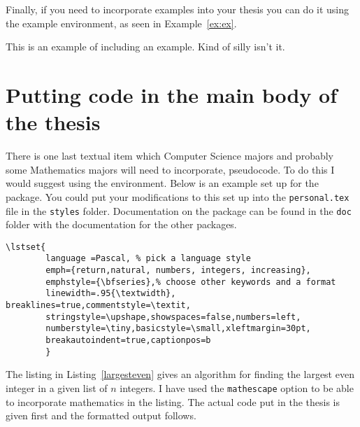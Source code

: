 Finally, if you need to incorporate examples into your thesis you can do it using the example environment, as seen in Example~\ref{ex:ex}.
\begin{singlespace}
\begin{example}
\begin{ex}
\label{ex:ex}
This is an example of including an
 example. Kind of silly isn't it.
 \end{ex}
\end{example}
\end{singlespace}

\section{Putting code in the main body of the thesis}
There is one last textual item which Computer Science majors and probably some Mathematics majors will need to incorporate, pseudocode. To do this I would suggest using the  environment. Below is an example set up for the  package. You could put your modifications to this set up into the \texttt{personal.tex} file in the \texttt{styles} folder. Documentation on the  package can be found in the \texttt{doc} folder with the documentation for the other packages.
{\small\begin{singlespace}
\begin{verbatim}
\lstset{
        language =Pascal, % pick a language style
        emph={return,natural, numbers, integers, increasing},
        emphstyle={\bfseries},% choose other keywords and a format
        linewidth=.95{\textwidth}, breaklines=true,commentstyle=\textit,
        stringstyle=\upshape,showspaces=false,numbers=left,
        numberstyle=\tiny,basicstyle=\small,xleftmargin=30pt,
        breakautoindent=true,captionpos=b
        }
\end{verbatim}
\end{singlespace}}

The listing in Listing~\ref{largesteven} gives an algorithm for finding the largest even integer in a given list of $n$ integers. I have used the \texttt{mathescape} option to be able to incorporate mathematics in the listing. The actual code put in the thesis is given first and the formatted output follows.

